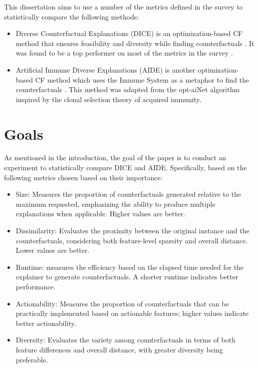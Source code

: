 \documentclass[a4paper,12pt]{article}
\begin{document}
This dissertation aims to use a number of the metrics defined in the survey to statistically compare the following methods:

\begin{itemize}
\item Diverse Counterfactual Explanations (DICE) is an optimization-based CF method that ensures feasibility and diversity while finding counterfactuals \cite{mothilal2020explaining}. It was found to be a top performer on most of the metrics in the survey \cite{guidotti2024counterfactual}.  
\item Artificial Immune Diverse Explanations (AIDE) is another optimization-based CF method which uses the Immune System as a metaphor to find the counterfactuals \cite{forrest2021contrastive}. This method was adapted from the opt-aiNet algorithm \cite{brownlee2011clever} inspired by the clonal selection theory of acquired immunity. 
\end{itemize}

\section*{Goals}
As mentioned in the introduction, the goal of the paper is to conduct an experiment to statistically compare DICE and AIDE. Specifically, based on the following metrics chosen based on their importance:

\begin{itemize}
\item Size: Measures the proportion of counterfactuals generated relative to the maximum requested, emphasizing the ability to produce multiple explanations when applicable. Higher values are better.
\item Dissimilarity: Evaluates the proximity between the original instance and the counterfactuals, considering both feature-level sparsity and overall distance. Lower values are better.
\item Runtime: measures the efficiency based on the elapsed time needed for the explainer to generate counterfactuals. A shorter runtime indicates better performance.
\item Actionability: Measures the proportion of counterfactuals that can be practically implemented based on actionable features; higher values indicate better actionability.
\item Diversity: Evaluates the variety among counterfactuals in terms of both feature differences and overall distance, with greater diversity being preferable.
\end{itemize}
\end{document}
